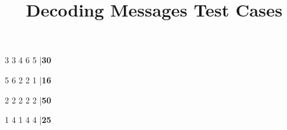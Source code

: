 \documentclass{../../codeproblem}
\begin{document}
\title{Decoding Messages Test Cases}

\begin{example}
3 3 4 6 5
|\textbf{30}\end{example}

\begin{example}
5 6 2 2 1
|\textbf{16}\end{example}

\begin{example}
2 2 2 2 2
|\textbf{50}\end{example}

\begin{example}
1 4 1 4 4
|\textbf{25}\end{example}
\end{document}
